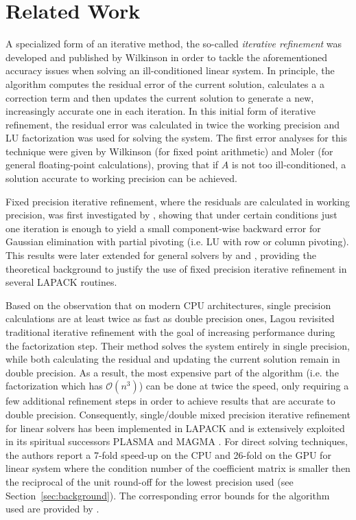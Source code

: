 \section{Related Work}
\label{sec:related_work}

A specialized form of an iterative method, the so-called \textit{iterative refinement} was developed and published by Wilkinson \cite{wilkinson_rounding_1963} in order to tackle the aforementioned accuracy issues when solving an ill-conditioned linear system. In principle, the algorithm computes the residual error of the current solution, calculates a a correction term and then updates the current solution to generate a new, increasingly accurate one in each iteration. In this initial form of iterative refinement, the residual error was calculated in twice the working precision and LU factorization was used for solving the system. The first error analyses for this technique were given by Wilkinson \cite{wilkinson_rounding_1963} (for fixed point arithmetic) and Moler \cite{moler_iterative_1967} (for general floating-point calculations), proving that if $A$ is not too ill-conditioned, a solution accurate to working precision can be achieved.

Fixed precision iterative refinement, where the residuals are calculated in working precision, was first investigated by \cite{skeel_iterative_1980}, showing that under certain conditions just one iteration is enough to yield a small component-wise backward error for Gaussian elimination with partial pivoting (i.e. LU with row or column pivoting). This results were later extended for general solvers by \cite{higham_iterative_1991} and \cite{higham_iterative_1997}, providing the theoretical background to justify the use of fixed precision iterative refinement in several LAPACK \cite{anderson_lapack_1999} routines.

Based on the observation that on modern CPU architectures, single precision calculations are at least twice as fast as double precision ones, Lagou \cite{langou_exploiting_2006} revisited traditional iterative refinement with the goal of increasing performance during the factorization step. Their method solves the system entirely in single precision, while both calculating the residual and updating the current solution remain in double precision. As a result, the most expensive part of the algorithm (i.e. the factorization which has $\mathcal{O}(n^3)$) can be done at twice the speed, only requiring a few additional refinement steps in order to achieve results that are accurate to double precision. Consequently, single/double mixed precision iterative refinement for linear solvers has been implemented in LAPACK \cite{anderson_lapack_1999} and is extensively exploited in its spiritual successors PLASMA and MAGMA \cite{abdelfattah_linear_2016}. For direct solving techniques, the authors report a 7-fold speed-up on the CPU and 26-fold on the GPU for linear system where the condition number of the coefficient matrix is smaller then the reciprocal of the unit round-off for the lowest precision used (see Section~\hyperref[sec:background]{\ref{sec:background}}). The corresponding error bounds for the algorithm used are provided by \cite{arioli_using_2008}.


